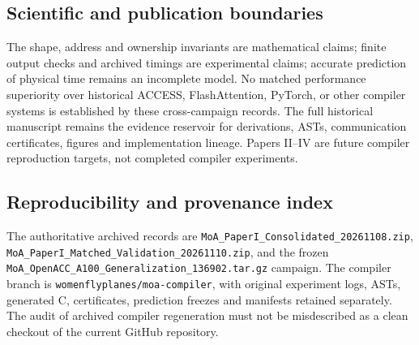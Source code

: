 \documentclass[11pt]{article}
\begin{document}
\subsection{Scientific and publication boundaries}
The shape, address and ownership invariants are mathematical claims; finite output checks and archived timings are experimental claims; accurate prediction of physical time remains an incomplete model. No matched performance superiority over historical ACCESS, FlashAttention, PyTorch, or other compiler systems is established by these cross-campaign records. The full historical manuscript remains the evidence reservoir for derivations, ASTs, communication certificates, figures and implementation lineage. Papers II--IV are future compiler reproduction targets, not completed compiler experiments.

\subsection{Reproducibility and provenance index}
The authoritative archived records are \nolinkurl{MoA_PaperI_Consolidated_20261108.zip}, \nolinkurl{MoA_PaperI_Matched_Validation_20261110.zip}, and the frozen \nolinkurl{MoA_OpenACC_A100_Generalization_136902.tar.gz} campaign. The compiler branch is \texttt{womenflyplanes/moa-compiler}, with original experiment logs, ASTs, generated C, certificates, prediction freezes and manifests retained separately. The audit of archived compiler regeneration must not be misdescribed as a clean checkout of the current GitHub repository.
\end{document}
